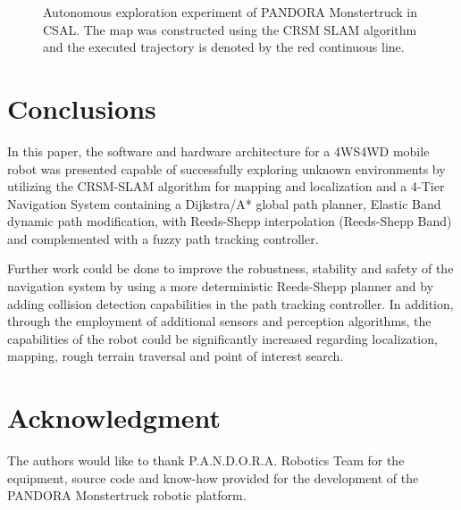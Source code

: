 \documentclass[conference]{IEEEtran}
\begin{document}
\begin{figure}[!ht]
	\centering
	\caption{Autonomous exploration experiment of PANDORA Monstertruck in CSAL. The map was constructed using the CRSM SLAM algorithm and the executed trajectory is denoted by the red continuous line.}
	\label{fig:exploration_exp}
\end{figure}


\section{Conclusions} \label{sec:conclusions}
In this paper, the software and hardware architecture for a 4WS4WD mobile robot was presented capable of successfully exploring unknown environments by utilizing the CRSM-SLAM algorithm for mapping and localization and a 4-Tier Navigation System containing a Dijkstra/A* global path planner, Elastic Band dynamic path modification, with Reeds-Shepp interpolation (Reeds-Shepp Band) and complemented with a fuzzy path tracking controller.

Further work could be done to improve the robustness, stability and safety of the navigation system by using a more deterministic Reeds-Shepp planner and by adding collision detection capabilities in the path tracking controller. In addition, through the employment of additional sensors and perception algorithms, the capabilities of the robot could be significantly increased regarding localization, mapping, rough terrain traversal and point of interest search.

\section*{Acknowledgment}
The authors would like to thank P.A.N.D.O.R.A. Robotics Team for the equipment, source code and know-how provided for the development of the PANDORA Monstertruck robotic platform.




\end{document}
